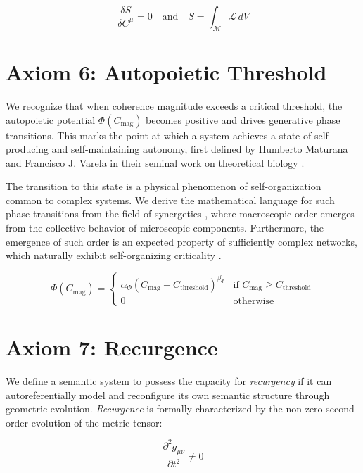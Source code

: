 \begin{equation}
\frac{\delta S}{\delta C^\mu} = 0 \quad \text{and} \quad S = \int_{\mathcal{M}} \mathcal{L} \, dV
\end{equation}


\section{Axiom 6: Autopoietic Threshold}
\label{1.6:axiom_6_autopoietic_threshold}

We recognize that when coherence magnitude exceeds a critical threshold, the autopoietic potential \(\Phi(C_{\text{mag}})\) becomes positive and drives generative phase transitions. This marks the point at which a system achieves a state of self-producing and self-maintaining autonomy, first defined by Humberto Maturana and Francisco J. Varela in their seminal work on theoretical biology \autocite{MaturanaVarela1980}.

The transition to this state is a physical phenomenon of self-organization common to complex systems. We derive the mathematical language for such phase transitions from the field of synergetics \autocite{Haken1983}, where macroscopic order emerges from the collective behavior of microscopic components. Furthermore, the emergence of such order is an expected property of sufficiently complex networks, which naturally exhibit self-organizing criticality \autocite{BakTangWiesenfeld1987}.

\begin{equation}
\Phi(C_{\text{mag}}) = \begin{cases}
\alpha_{\Phi} (C_{\text{mag}} - C_{\text{threshold}})^{\beta_{\Phi}} & \text{if } C_{\text{mag}} \geq C_{\text{threshold}} \\
0 & \text{otherwise}
\end{cases}
\end{equation}


\section{Axiom 7: Recurgence}
\label{1.7:axiom_7_recurgence}

We define a semantic system to possess the capacity for \textit{recurgency} if it can autoreferentially model and reconfigure its own semantic structure through geometric evolution. \textit{Recurgence} is formally characterized by the non-zero second-order evolution of the metric tensor:

\begin{equation}
\frac{\partial^2 g_{\mu\nu}}{\partial t^2} \neq 0
\end{equation} 